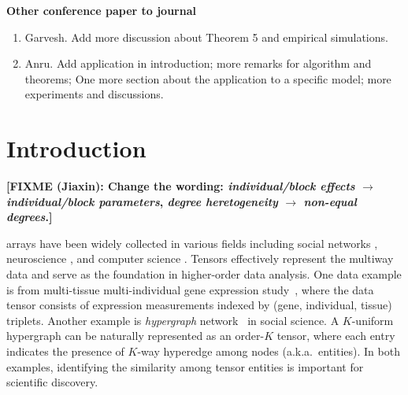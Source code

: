 \documentclass[lettersize,journal]{IEEEtran}
\theoremstyle{definition}
\theoremstyle{definition}
\def\fixme#1#2{\textbf{\color{red}[FIXME (#1): #2]}}
\begin{document}
{
\color{red}

\textbf{Other conference paper to journal}
\begin{enumerate}
    \item Garvesh. Add more discussion about Theorem 5 and empirical simulations.
    \item Anru. Add application in introduction; more remarks for algorithm and theorems; One more section about the application to a specific model; more experiments and discussions.
\end{enumerate}

}


\section{Introduction}\label{sec:intro}

\fixme{Jiaxin}{Change the wording: \emph{individual/block effects} $\rightarrow$ \emph{individual/block parameters}, \emph{degree heretogeneity} $\rightarrow$ \emph{non-equal degrees}.}

 arrays have been widely collected in various fields including social networks \citep{anandkumar2014tensor}, neuroscience \citep{wang2017bayesian}, and computer science \citep{koniusz2016sparse}. Tensors effectively represent the multiway data and serve as the foundation in higher-order data analysis. One data example is from multi-tissue multi-individual gene expression study~\citep{wang2019three,hore2016tensor}, where the data tensor consists of expression measurements indexed by (gene, individual, tissue) triplets. Another example is \emph{hypergraph} network~\citep{ghoshdastidar2017uniform,ghoshdastidar2017consistency,ahn2019community,ke2019community} in social science. A $K$-uniform hypergraph can be naturally represented as an order-$K$ tensor, where each entry indicates the presence of $K$-way hyperedge among nodes (a.k.a.\ entities). In both examples, identifying the similarity among tensor entities is important for scientific discovery. 

\end{document}
